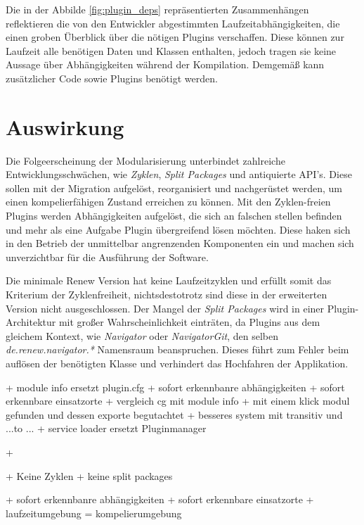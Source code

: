 Die in der Abbilde \ref{fig:plugin_deps} repräsentierten Zusammenhängen reflektieren die von den Entwickler abgestimmten Laufzeitabhängigkeiten, die einen groben Überblick über die nötigen Plugins verschaffen. Diese können zur Laufzeit alle benötigen Daten und Klassen enthalten, jedoch tragen sie keine Aussage über Abhängigkeiten während der Kompilation. Demgemäß kann zusätzlicher Code sowie Plugins benötigt werden. 


\section{Auswirkung} \label{auswirkung}

Die Folgeerscheinung der Modularisierung unterbindet zahlreiche Entwicklungsschwächen, wie \textit{Zyklen}, \textit{Split Packages} und antiquierte API's. Diese sollen mit der Migration aufgelöst,  reorganisiert und nachgerüstet werden, um einen kompelierfähigen Zustand erreichen zu können. 
Mit den Zyklen-freien Plugins werden Abhängigkeiten aufgelöst, die sich an falschen stellen befinden und mehr als eine Aufgabe Plugin übergreifend lösen möchten. Diese haken sich in den Betrieb der unmittelbar angrenzenden Komponenten ein und machen sich unverzichtbar für die Ausführung der Software. 
\bigbreak

Die minimale Renew Version hat keine Laufzeitzyklen und erfüllt somit das Kriterium der Zyklenfreiheit, nichtsdestotrotz sind diese in der erweiterten Version nicht ausgeschlossen. Der Mangel der \textit{Split Packages} wird in einer Plugin-Architektur mit großer Wahrscheinlichkeit einträten, da Plugins aus dem gleichem Kontext, wie \textit{Navigator} oder \textit{NavigatorGit}, den selben \textit{de.renew.navigator.*} Namensraum beanspruchen. Dieses führt zum Fehler beim auflösen der benötigten Klasse und verhindert das Hochfahren der Applikation. 
\bigbreak


+ module info ersetzt plugin.cfg 
	+ sofort erkennbanre abhängigkeiten
	+ sofort erkennbare einsatzorte 
		+ vergleich  cg mit module info 
	+ mit einem klick modul gefunden und dessen exporte begutachtet 
	+ besseres system mit transitiv  und ...to ...
+ service loader ersetzt Pluginmanager 

\newpage


+

+ Keine Zyklen 
+ keine split packages

+ sofort erkennbanre abhängigkeiten
+ sofort erkennbare einsatzorte 
+ laufzeitumgebung = kompelierumgebung 

